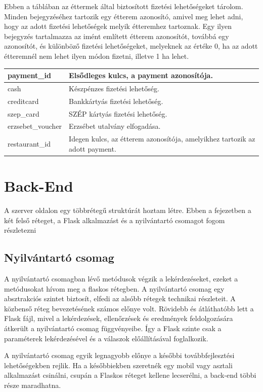 Ebben a táblában az éttermek által biztosított fizetési lehetőségeket tárolom. Minden bejegyzéséhez tartozik egy étterem azonosító, amivel meg lehet adni, hogy az adott fizetési lehetőségek melyik étteremhez tartoznak. Egy ilyen bejegyzés tartalmazza az imént említett étterem azonosítót, továbbá egy azonosítót, és különböző fizetési lehetőségeket, melyeknek az értéke 0, ha az adott étteremnél nem lehet ilyen módon fizetni, illetve 1 ha lehet.

\begin{tabular}{|p{3cm}|p{10cm}|}
    payment\_id & Elsődleges kulcs, a payment azonosítója. \\
    \hline
    cash & Készpénzes fizetési lehetőség. \\
    \hline
    creditcard & Bankkártyás fizetési lehetőség. \\
    \hline
    szep\_card & SZÉP kártyás fizetési lehetőség. \\
    \hline
    erzsebet\_voucher & Erzsébet utalvány elfogadása. \\
    \hline
    restaurant\_id & Idegen kulcs, az étterem azonosítója, amelyikhez tartozik az adott payment. \\
    \hline
\end{tabular}

\section{Back-End}

A szerver oldalon egy többrétegű struktúrát hoztam létre. Ebben a fejezetben a két felső réteget, a Flask alkalmazást és a nyilvántartó csomagot fogom részletezni

\subsection{Nyilvántartó csomag}

A nyilvántartó csomagban lévő metódusok végzik a lekérdezéseket, ezeket a metódusokat hívom meg a flaskos rétegben. A nyilvántartó csomag egy absztrakciós szintet biztosít, elfedi az alsóbb rétegek technikai részleteit. A közbenső réteg bevezetésének számos előnye volt. Rövidebb és átláthatóbb lett a Flask fájl, mivel a lekérdezések, ellenőrzések és eredmények feldolgozására átkerült a nyilvántartó csomag függvényeibe. Így a Flask szinte csak a paraméterek lekérdezésével és a válaszok előállításával foglalkozik.

A nyilvántartó csomag egyik legnagyobb előnye a későbbi továbbfejlesztési lehetőségekben rejlik. Ha a későbbiekben szeretnék egy mobil vagy asztali alkalmazást csinálni, csupán a Flaskos réteget kellene lecserélni, a back-end többi része maradhatna.

